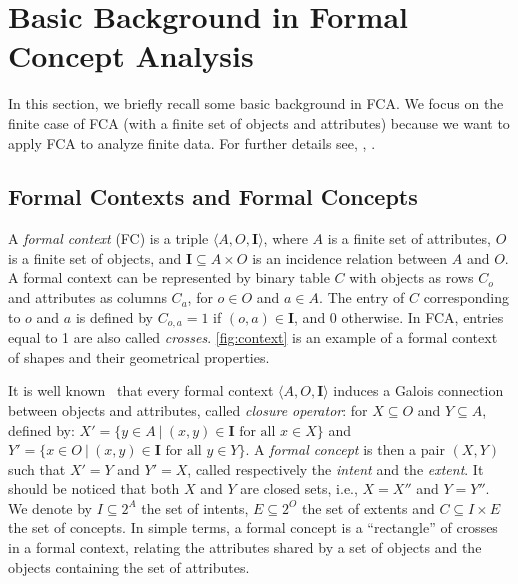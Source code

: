 \section{Basic Background in Formal Concept Analysis\label{sec:background_fca}}
In this section, we briefly recall some basic background in FCA. 
We focus on the finite case of FCA (with a finite set of objects and attributes) because we want to apply FCA to analyze finite data.
For further details see, \eg, \cite{formal:1999:bernhard,fca-images:2017:ignatov}.

\subsection{Formal Contexts and Formal Concepts \label{sec:fc}}
A \textit{formal context} (FC) is a triple $\langle A, O, \mathbf{I}\rangle $,
where $A$ is a finite set of attributes, $O$ is  a finite set of objects,
and $\mathbf{I} \subseteq A \times O$ is an incidence relation between $A$ and $O$.
A formal context can be represented by binary table $C$ with objects as rows $C_{o}$ and attributes as columns $C_{a}$, for $o\in O$ and $a\in A$.
The entry of $C$ corresponding to $o$ and $a$ is defined by $C_{o,a}=1$ if $(o,a)\in \mathbf{I}$, and $0$ otherwise.
In FCA, entries equal to 1 are also called \textit{crosses}.
\cref{fig:context} is an example of a formal context of shapes and their geometrical properties.

It is well known~\cite{formal:1999:bernhard} that every formal context $\langle A, O, \mathbf{I}\rangle $ induces a Galois connection between objects and attributes, called \textit{closure operator}: for $X\subseteq O$ and $Y\subseteq A$, defined by:
$X' = \{ y\in A~|~ (x, y) \in \mathbf{I} \textrm{ for all } x\in X \}$ and
$Y' = \{ x\in O~|~ (x, y) \in \mathbf{I} \textrm{ for all } y\in Y \}$.
A \textit{formal concept} is then a pair $(X,Y)$ such that $X'=Y$ and $Y'=X$,  called respectively the {\it intent} and the {\it extent}. 
It should be noticed that both $X$ and $Y$ are closed sets, i.e.,  $X=X''$ and $Y=Y''$.
We denote by $I \subseteq 2^A$ the set of intents, $E \subseteq 2^O$ the set of extents and $C \subseteq I\times E$ the set of concepts.
%
In simple terms, a formal concept is a ``rectangle'' of crosses in a formal context, relating the attributes shared by a set of objects and the objects containing the set of attributes.

